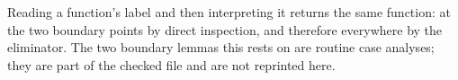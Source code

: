 \documentclass[11pt,a4paper]{book}
\begin{document}
Reading a function's label and then interpreting it returns the same
function: at the two boundary points by direct inspection, and therefore
everywhere by the eliminator. The two boundary lemmas this rests on are
routine case analyses; they are part of the checked file and are not
reprinted here.

\begin{code}[hide]%
%
\>[2]\AgdaSpace{}%
\AgdaSymbol{:}\AgdaSpace{}%
\AgdaSymbol{(}\AgdaSpace{}%
\AgdaSymbol{:}\AgdaSpace{}%
\AgdaSymbol{)}\AgdaSpace{}%
\AgdaSpace{}%
\AgdaSpace{}%
\AgdaSymbol{(}\AgdaSpace{}%
\AgdaSymbol{)}\AgdaSpace{}%
\AgdaSymbol{(}\AgdaSpace{}%
\AgdaSymbol{)}\AgdaSpace{}%
\AgdaSpace{}%
\AgdaSpace{}%
\AgdaSymbol{(}\AgdaSpace{}%
\AgdaSymbol{)}\<%
\\
%
\>[2]\AgdaSpace{}%
\AgdaSpace{}%
\AgdaSpace{}%
\AgdaSpace{}%
\AgdaSpace{}%
\AgdaSymbol{(}\AgdaSpace{}%
\AgdaSymbol{(}\AgdaSpace{}%
\AgdaSymbol{))}\AgdaSpace{}%
\AgdaSymbol{|}\AgdaSpace{}%
\AgdaSpace{}%
\AgdaSpace{}%
\AgdaSymbol{(}\AgdaSpace{}%
\AgdaSymbol{(}\AgdaSpace{}%
\AgdaSymbol{))}\<%
\\
%
\>[2]\AgdaSpace{}%
\AgdaSymbol{|}\AgdaSpace{}%
\AgdaSpace{}%
\AgdaSpace{}%
\AgdaSymbol{|}\AgdaSpace{}%
\AgdaSpace{}%
\AgdaSymbol{\AgdaUnderscore{}}%
\>[31]\AgdaSymbol{=}\AgdaSpace{}%
\AgdaSpace{}%
\<%
\\
%
\>[2]\AgdaSpace{}%
\AgdaSymbol{|}\AgdaSpace{}%
\AgdaSpace{}%
\AgdaSpace{}%
\AgdaSymbol{|}\AgdaSpace{}%
\AgdaSpace{}%
\AgdaSymbol{\AgdaUnderscore{}}%
\>[31]\AgdaSymbol{=}\AgdaSpace{}%
\AgdaSpace{}%
\<%
\\
%
\>[2]\AgdaSpace{}%
\AgdaSymbol{|}\AgdaSpace{}%
\AgdaSpace{}%
\AgdaSpace{}%
\AgdaSymbol{|}\AgdaSpace{}%
\AgdaSpace{}%
\AgdaSymbol{\AgdaUnderscore{}}%
\>[31]\AgdaSymbol{=}\AgdaSpace{}%
\AgdaSpace{}%

\end{code}
\end{document}
